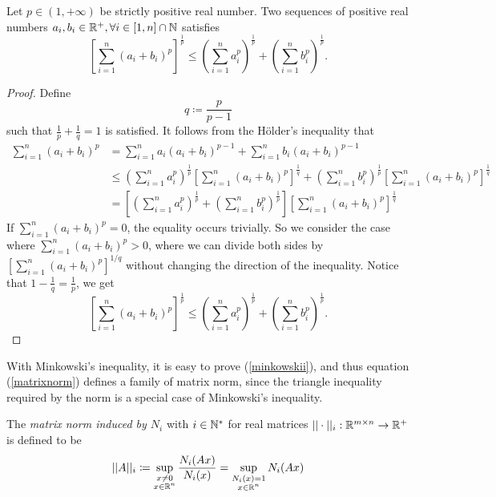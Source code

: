 \begin{theorem}\label{minkowski}
Let \(p\in(1,+\infty)\) be strictly positive real number.
Two sequences of positive real numbers \(a_i,b_i\in\mathbb{R}^+,\forall i\in[1,n]\cap\mathbb{N}\) satisfies
\begin{equation}
\left[\sum_{i=1}^n (a_i+b_i)^p\right]^\frac{1}{p}\leq\left(\sum_{i=1}^n a_i^p\right)^\frac{1}{p}+\left(\sum_{i=1}^n b_i^p\right)^\frac{1}{p}.
\end{equation}
\end{theorem}
\begin{proof}
Define
\[ q\coloneqq\frac{p}{p-1} \]
such that \(\frac{1}{p}+\frac{1}{q}=1\) is satisfied.
It follows from the H\"{o}lder's inequality that
\begin{align*}
\sum_{i=1}^n(a_i+b_i)^p&=\sum_{i=1}^na_i(a_i+b_i)^{p-1}+\sum_{i=1}^nb_i(a_i+b_i)^{p-1}\\
&\leq \left(\sum_{i=1}^na_i^p\right)^\frac{1}{p}\left[\sum_{i=1}^n(a_i+b_i)^{p}\right]^\frac{1}{q}
+\left(\sum_{i=1}^nb_i^p\right)^\frac{1}{p}\left[\sum_{i=1}^n(a_i+b_i)^{p}\right]^\frac{1}{q}\\
&=\left[\left(\sum_{i=1}^na_i^p\right)^\frac{1}{p}+\left(\sum_{i=1}^nb_i^p\right)^\frac{1}{p}\right]\left[\sum_{i=1}^n(a_i+b_i)^{p}\right]^\frac{1}{q}
\end{align*}
If \(\sum_{i=1}^n (a_i+b_i)^p=0\), the equality occurs trivially.
So we consider the case where \(\sum_{i=1}^n (a_i+b_i)^p>0\), where we can divide both sides by \(\left[\sum_{i=1}^n (a_i+b_i)^p\right]^{1/q}\) without changing the direction of the inequality.
Notice that \(1-\frac{1}{q}=\frac{1}{p}\), we get
\[ \left[\sum_{i=1}^n(a_i+b_i)^p\right]^\frac{1}{p}\leq\left(\sum_{i=1}^n a_i^p\right)^\frac{1}{p}+\left(\sum_{i=1}^n b_i^p\right)^\frac{1}{p}. \]
\cite{utx}
\end{proof}


With Minkowski's inequality, it is easy to prove (\ref{minkowskii}), and thus equation (\ref{matrixnorm}) defines a family of matrix norm, since the triangle inequality required by the norm is a special case of Minkowski's inequality.

\begin{definition}
The \emph{matrix norm induced by \(N_i\)} with \(i\in\mathbb{N}^*\) for real matrices \(||\cdot||_i:\mathbb{R}^{m\times n}\to\mathbb{R}^+\) is defined to be
\begin{equation}
||A||_i\coloneqq\sup_{\substack{x\neq0\\ x\in\mathbb{R}^n}}\frac{N_i(Ax)}{N_i(x)}=\sup_{\substack{N_i(x)=1 \\ x\in\mathbb{R}^n}}N_i(Ax)
\end{equation}
\end{definition}

